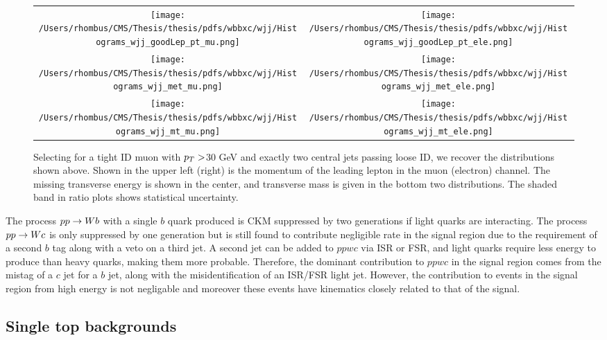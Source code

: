 \begin{figure}
 \caption[\wjj control region for the \wbb measurement]{
  Selecting for a tight ID muon with $p_T>$30 GeV and exactly two central jets passing loose ID,
   we recover the distributions shown above. 
  Shown in the upper left (right)
   is the momentum of the leading lepton in the muon (electron) channel.
  The missing transverse energy is shown in the center,
  and transverse mass is given in the bottom two distributions.
  The shaded band in ratio plots shows statistical uncertainty. 
 } 
\begin{centering}
\begin{tabular}{cc}
 \texttt{[image: /Users/rhombus/CMS/Thesis/thesis/pdfs/wbbxc/wjj/Histograms\_wjj\_goodLep\_pt\_mu.png]} &
 \texttt{[image: /Users/rhombus/CMS/Thesis/thesis/pdfs/wbbxc/wjj/Histograms\_wjj\_goodLep\_pt\_ele.png]} \\
 \texttt{[image: /Users/rhombus/CMS/Thesis/thesis/pdfs/wbbxc/wjj/Histograms\_wjj\_met\_mu.png]} & 
 \texttt{[image: /Users/rhombus/CMS/Thesis/thesis/pdfs/wbbxc/wjj/Histograms\_wjj\_met\_ele.png]} \\
 \texttt{[image: /Users/rhombus/CMS/Thesis/thesis/pdfs/wbbxc/wjj/Histograms\_wjj\_mt\_mu.png]}  & 
 \texttt{[image: /Users/rhombus/CMS/Thesis/thesis/pdfs/wbbxc/wjj/Histograms\_wjj\_mt\_ele.png]} 
\end{tabular}
\end{centering}
    \label{fig:wjj_plots}
\end{figure}

The process $pp\rightarrow Wb$ with a single $b$ quark
 produced is CKM suppressed by two generations
 if light quarks are interacting.
The process $pp\rightarrow Wc$ is only suppressed by one
 generation but is still found to contribute
 negligible rate in the signal region due to
 the requirement of a second $b$ tag along
 with a veto on a third jet.
A second jet can be added to $ppwc$ via ISR or FSR,
 and light quarks require less energy to produce
 than heavy quarks, making them more probable.
Therefore, the dominant contribution to 
 $ppwc$ in the signal region comes from the 
 mistag of a $c$ jet for a $b$ jet, along with 
 the misidentification of an ISR/FSR light jet.
However, the contribution to events in the signal region
 from high energy \gcc is not negligable and
 moreover these events have kinematics closely related 
 to that of the signal. 

\subsection{Single top backgrounds}
\label{section:topbackgrounds}

